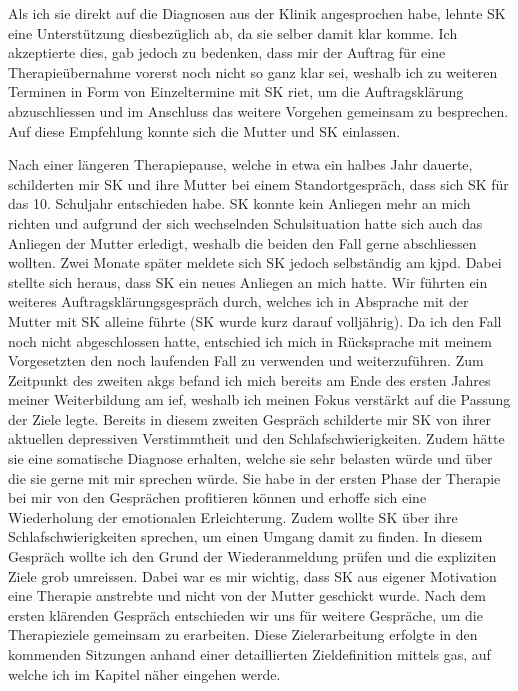 Als ich sie direkt auf die Diagnosen aus der Klinik angesprochen habe, lehnte SK eine Unterstützung diesbezüglich ab, da sie selber damit klar komme. Ich akzeptierte dies, gab jedoch zu bedenken, dass mir der Auftrag für eine Therapieübernahme vorerst noch nicht so ganz klar sei, weshalb ich zu weiteren Terminen in Form von Einzeltermine mit SK riet, um die Auftragsklärung abzuschliessen und im Anschluss das weitere Vorgehen gemeinsam zu besprechen. Auf diese Empfehlung konnte sich die Mutter und SK einlassen.

Nach einer längeren Therapiepause, welche in etwa ein halbes Jahr dauerte, schilderten mir SK und ihre Mutter bei einem Standortgespräch, dass sich SK für das 10. Schuljahr entschieden habe. SK konnte kein Anliegen mehr an mich richten und aufgrund der sich wechselnden Schulsituation hatte sich auch das Anliegen der Mutter erledigt, weshalb die beiden den Fall gerne abschliessen wollten. Zwei Monate später meldete sich SK jedoch selbständig am \ac{kjpd}. Dabei stellte sich heraus, dass SK ein neues Anliegen an mich hatte. Wir führten ein weiteres Auftragsklärungsgespräch durch, welches ich in Absprache mit der Mutter mit SK alleine führte (SK wurde kurz darauf volljährig). Da ich den Fall noch nicht abgeschlossen hatte, entschied ich mich in Rücksprache mit meinem Vorgesetzten den noch laufenden Fall zu verwenden und weiterzuführen. Zum Zeitpunkt des zweiten \acp{akg} befand ich mich bereits am Ende des ersten Jahres meiner Weiterbildung am \ac{ief}, weshalb ich meinen Fokus verstärkt auf die Passung der Ziele legte. Bereits in diesem zweiten Gespräch schilderte mir SK von ihrer aktuellen depressiven Verstimmtheit und den Schlafschwierigkeiten. Zudem hätte sie eine somatische Diagnose erhalten, welche sie sehr belasten würde und über die sie gerne mit mir sprechen würde. Sie habe in der ersten Phase der Therapie bei mir von den Gesprächen profitieren können und erhoffe sich eine Wiederholung der emotionalen Erleichterung. Zudem wollte SK über ihre Schlafschwierigkeiten sprechen, um einen Umgang damit zu finden. In diesem Gespräch wollte ich den Grund der Wiederanmeldung prüfen und die expliziten Ziele grob umreissen. Dabei war es mir wichtig, dass SK aus eigener Motivation eine Therapie anstrebte und nicht von der Mutter geschickt wurde. Nach dem ersten klärenden Gespräch entschieden wir uns für weitere Gespräche, um die Therapieziele gemeinsam zu erarbeiten. Diese Zielerarbeitung erfolgte in den kommenden Sitzungen anhand einer detaillierten Zieldefinition mittels \ac{gas}, auf welche ich im Kapitel  näher eingehen werde.


